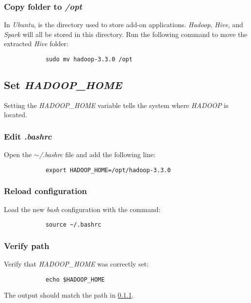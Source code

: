 \documentclass{article}
\begin{document}
        \subsubsection{Copy folder to \emph{/opt}}
        In \emph{Ubuntu},  is the directory used to store add-on applications. \emph{Hadoop},
        \emph{Hive}, and \emph{Spark} will all be stored in this directory. Run the following command to
        move the extracted \emph{Hive} folder:
        \begin{verbatim}
            sudo mv hadoop-3.3.0 /opt
        \end{verbatim}
    
    \subsection{Set \emph{HADOOP\_HOME}}
    Setting the \emph{HADOOP\_HOME} variable tells the system where \emph{HADOOP} is located.

        \subsubsection{Edit \emph{.bashrc}}
        \label{subsec:hadoophome}
        Open the \emph{$\sim$/.bashrc} file and add the following line:
        \begin{verbatim}
            export HADOOP_HOME=/opt/hadoop-3.3.0
        \end{verbatim}

        \subsubsection{Reload configuration}
        \label{subsec:reloadbash}
        Load the new \emph{bash} configuration with the command:
        \begin{verbatim}
            source ~/.bashrc
        \end{verbatim}

        \subsubsection{Verify path}
        Verify that \emph{HADOOP\_HOME} was correctly set:
        \begin{verbatim}
            echo $HADOOP_HOME
        \end{verbatim}
        The output should match the path in \ref{subsec:hadoophome}.
    
\end{document}
